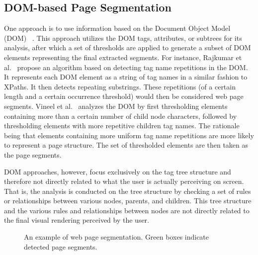 \subsection{DOM-based Page Segmentation}
One approach is to use information based on the Document Object Model (DOM)~
\cite{rajkumar2012dynamic,vineel2009web,kang2010repetition}.
This approach utilizes the DOM tags, attributes, or subtrees for its analysis,
after which a set of thresholds are applied to generate a subset of DOM elements
representing the final extracted segments.
For instance, Rajkumar et al.~\cite{rajkumar2012dynamic} propose an algorithm based
on detecting tag name repetitions in the DOM.
It represents each DOM element as a string of tag names in a similar fashion
to XPaths. It then detects repeating substrings.
These repetitions (of a certain length and a certain occurrence threshold)
would then be considered web page segments.
Vineel et al.~\cite{vineel2009web} 
analyzes the DOM by first thresholding elements containing more than a certain number
of child node characters, followed by thresholding elements with more repetitive
children tag names. The rationale being that elements containing more uniform tag name
repetitions are more likely to represent a page structure.
The set of thresholded elements are then taken as the page segments.

DOM approaches, however, focus exclusively on the tag tree structure
and therefore not directly related
to what the user is actually perceiving on screen.
That is, the analysis is conducted on the tree structure by checking a set of
rules or relationships between various nodes, parents, and children.
This tree structure and the various rules and relationships between nodes
are not directly related to the final visual rendering perceived by the user.

\begin{figure}
    \centering
    {%
    \setlength{\fboxsep}{0pt}%
    \setlength{\fboxrule}{1pt}%
    }%
    \caption{An example of web page segmentation.
    Green boxes indicate detected page segments.}
    \label{fig:motivating-example}
\end{figure}

